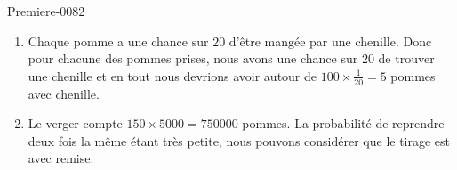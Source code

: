 
\begin{corrige}{Premiere-0082}

    \begin{enumerate}
        \item
            Chaque pomme a une chance sur \( 20\) d'être mangée par une chenille. Donc pour chacune des pommes prises, nous avons une chance sur \( 20\) de trouver une chenille et en tout nous devrions avoir autour de \( 100\times \frac{1}{ 20 }=5\) pommes avec chenille.
        \item
            Le verger compte \( 150\times 5000=750000\) pommes. La probabilité de reprendre deux fois la même étant très petite, nous pouvons considérer que le tirage est avec remise.
    \end{enumerate}

\end{corrige}
